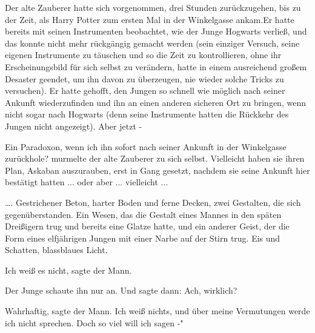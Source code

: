 Der alte Zauberer hatte sich vorgenommen, drei Stunden zurückzugehen, bis zu der
Zeit, als Harry Potter zum ersten Mal in der Winkelgasse ankam.Er hatte bereits
mit seinen Instrumenten beobachtet, wie der Junge Hogwarts verließ, und das
konnte nicht mehr rückgängig gemacht werden (sein einziger Versuch, seine
eigenen Instrumente zu täuschen und so die Zeit zu kontrollieren, ohne ihr
Erscheinungsbild für sich selbst zu verändern, hatte in einem ausreichend großem
Desaster geendet, um ihn davon zu überzeugen, nie wieder solche Tricks zu
versuchen). Er hatte gehofft, den Jungen so schnell wie möglich nach seiner
Ankunft wiederzufinden und ihn an einen anderen sicheren Ort zu bringen, wenn
nicht sogar nach Hogwarts (denn seine Instrumente hatten die Rückkehr des Jungen
nicht angezeigt). Aber jetzt -

\glqq Ein Paradoxon, wenn ich ihn sofort nach seiner Ankunft in der Winkelgasse
zurückhole?\grqq{} murmelte der alte Zauberer zu sich selbst. \glqq Vielleicht
haben sie ihren Plan, Askaban auszurauben, erst in Gang gesetzt, nachdem sie
seine Ankunft hier bestätigt hatten ... oder aber ... vielleicht ...\grqq{}


…. Gestrichener Beton, harter Boden und ferne Decken, zwei Gestalten, die sich
gegenüberstanden. Ein Wesen, das die Gestalt eines Mannes in den späten
Dreißigern trug und bereits eine Glatze hatte, und ein anderer Geist, der die
Form eines elfjährigen Jungen mit einer Narbe auf der Stirn trug. Eis und
Schatten, blassblaues Licht.

\glqq Ich weiß es nicht\grqq{}, sagte der Mann.

Der Junge schaute ihn nur an. Und sagte dann: \glqq Ach, wirklich?\grqq{}

\glqq Wahrhaftig\grqq{}, sagte der Mann. \glqq Ich weiß nichts, und über meine
Vermutungen werde ich nicht sprechen. Doch so viel will ich sagen -"

